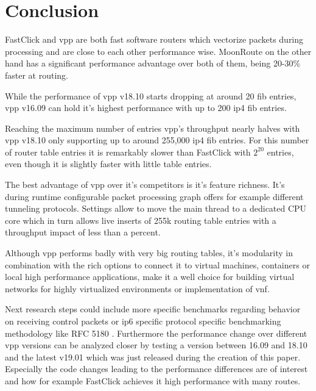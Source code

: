 \chapter{Conclusion}

FastClick and \Ac{vpp} are both fast software routers which vectorize
packets during processing and are close to each other performance
wise. MoonRoute on the other hand has a significant performance
advantage over both of them, being 20-30\% faster at routing.

While the performance of \Ac{vpp} v18.10 starts dropping at around 20
\Ac{fib} entries, \Ac{vpp} v16.09 can hold it's highest performance
with up to 200 \Ac{ip4} \Ac{fib} entries. 

Reaching the maximum number of entries \Ac{vpp}'s throughput nearly
halves with \Ac{vpp} v18.10 only supporting up to around 255,000
\Ac{ip4} \Ac{fib} entries. For this number of router table entries it
is remarkably slower than FastClick with $2^{20}$ entries, even though
it is slightly faster with little table entries.

The best advantage of \Ac{vpp} over it's competitors is it's feature
richness. It's during runtime configurable packet processing graph
offers for example different tunneling protocols. Settings allow to
move the main thread to a dedicated CPU core which in turn allows live
inserts of 255k routing table entries with a throughput impact of less
than a percent.

Although \Ac{vpp} performs badly with very big routing tables, it's
modularity in combination with the rich options to connect it to
virtual machines, containers or local high performance applications,
make it a well choice for building virtual networks for highly
virtualized environments or implementation of \Ac{vnf}.

Next research steps could include more specific benchmarks regarding
behavior on receiving control packets or \Ac{ip6} specific protocol
specific benchmarking methodology like RFC 5180 \cite{rfc5180}.
Furthermore the performance change over different \Ac{vpp} versions
can be analyzed closer by testing a version between 16.09 and 18.10
and the latest v19.01 which was just released during the creation of
this paper. Especially the code changes leading to the performance
differences are of interest and how for example FastClick achieves it
high performance with many routes.



